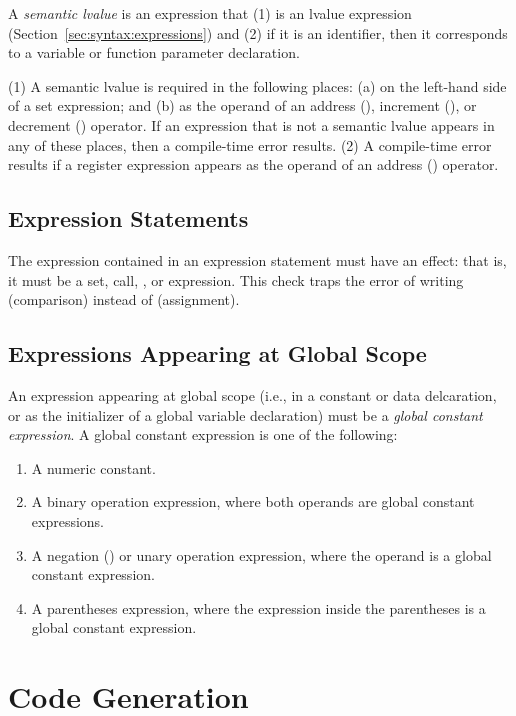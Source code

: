 \documentclass[10pt]{article}
\begin{document}
  A \emph{semantic lvalue} is
an expression that (1) is an lvalue expression
(Section~\ref{sec:syntax:expressions}) and (2) if it is an identifier,
then it corresponds to a variable or function parameter declaration.

  (1) A semantic lvalue is
required in the following places: (a) on the left-hand side of a set
expression; and (b) as the operand of an address (), increment
(), or decrement () operator.  If an expression
that is not a semantic lvalue appears in any of these places, then a
compile-time error results.  (2) A compile-time error results if a
register expression appears as the operand of an address ()
operator.


\subsection{Expression Statements}
\label{sec:semantics:expr-stmts}

The expression contained in an expression statement must have an
effect: that is, it must be a set, call, , or 
expression.  This check traps the error of writing 
(comparison) instead of  (assignment).

\subsection{Expressions Appearing at Global Scope}

An expression appearing at global scope (i.e., in a constant or data
delcaration, or as the initializer of a global variable declaration)
must be a \emph{global constant expression}.  A global constant
expression is one of the following:
%
\begin{enumerate}
%
\item A numeric constant.
%
\item A binary operation expression, where both operands are global
  constant expressions.
%
\item A negation (\kwd{-}) or  unary operation expression,
  where the operand is a global constant expression.
%
\item A parentheses expression, where the expression inside the
  parentheses is a global constant expression.
%
\end{enumerate}

\section{Code Generation}
\label{sec:code-gen}
\end{document}
